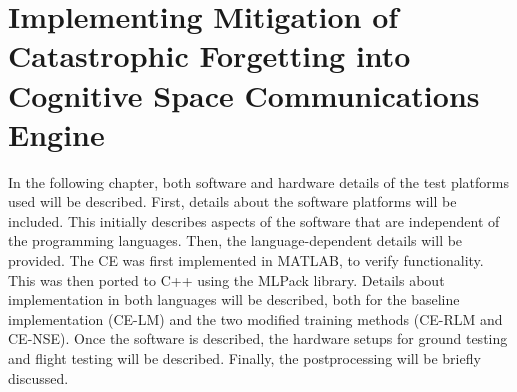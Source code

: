 \chapter{Implementing Mitigation of Catastrophic Forgetting into Cognitive Space Communications Engine}\label{ch:methods}
\par In the following chapter, both software and hardware details of the test platforms used will be described. First, details about the software platforms will be included. This initially describes aspects of the software that are independent of the programming languages. Then, the language-dependent details will be provided. The CE was first implemented in MATLAB, to verify functionality. This was then ported to C++ using the MLPack library. Details about implementation in both languages will be described, both for the baseline implementation (CE-LM) and the two modified training methods (CE-RLM and CE-NSE). Once the software is described, the hardware setups for ground testing and flight testing will be described. Finally, the postprocessing will be briefly discussed.
